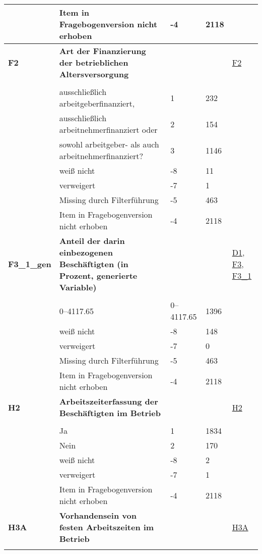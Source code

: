 \begin{longtable}{| L{2.5cm} | L{8.25cm}| C{1.5cm} | R{1.25cm} | C{2.25cm} |  }
   & Item in Fragebogenversion nicht erhoben & -4 & 2118 &  \\ 
   \midrule
\textbf{F2}\label{var:suf:F2} & \textbf{Art der Finanzierung der betrieblichen Altersversorgung} &  &  & \hyperref[F2]{F2} \\ 
   &  &  &  &  \\ 
   & ausschließlich arbeitgeberfinanziert, & 1 & 232 &  \\ 
   & ausschließlich arbeitnehmerfinanziert oder & 2 & 154 &  \\ 
   & sowohl arbeitgeber- als auch arbeitnehmerfinanziert? & 3 & 1146 &  \\ 
   & weiß nicht & -8 & 11 &  \\ 
   & verweigert & -7 & 1 &  \\ 
   & Missing durch Filterführung & -5 & 463 &  \\ 
   & Item in Fragebogenversion nicht erhoben & -4 & 2118 &  \\ 
   \midrule
\textbf{F3\_1\_gen}\label{var:suf:F3:1:gen} & \textbf{Anteil der darin einbezogenen Beschäftigten (in Prozent, generierte Variable)} &  &  & \hyperref[D1]{D1}, \hyperref[F3]{F3}, \hyperref[F3:1]{F3\_1} \\ 
   &  &  &  &  \\ 
   & 0--4117.65 & 0--4117.65 & 1396 &  \\ 
   & weiß nicht & -8 & 148 &  \\ 
   & verweigert & -7 & 0 &  \\ 
   & Missing durch Filterführung & -5 & 463 &  \\ 
   & Item in Fragebogenversion nicht erhoben & -4 & 2118 &  \\ 
   \midrule
\textbf{H2}\label{var:suf:H2} & \textbf{Arbeitszeiterfassung der Beschäftigten im Betrieb} &  &  & \hyperref[H2]{H2} \\ 
   &  &  &  &  \\ 
   & Ja & 1 & 1834 &  \\ 
   & Nein & 2 & 170 &  \\ 
   & weiß nicht & -8 & 2 &  \\ 
   & verweigert & -7 & 1 &  \\ 
   & Item in Fragebogenversion nicht erhoben & -4 & 2118 &  \\ 
   \midrule
\textbf{H3A}\label{var:suf:H3A} & \textbf{Vorhandensein von festen Arbeitszeiten im Betrieb} &  &  & \hyperref[H3A]{H3A} \\ 
   &  &  &  &  \\ 

\end{longtable}
